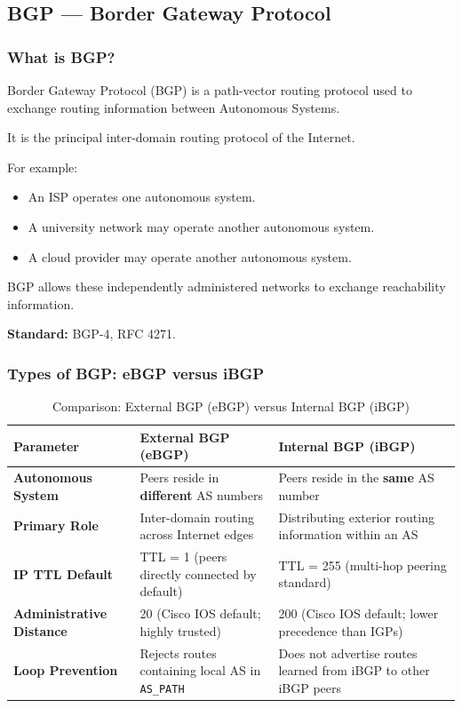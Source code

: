 \subsection{BGP --- Border Gateway Protocol}

\subsubsection{What is BGP?}

Border Gateway Protocol (BGP) is a path-vector routing protocol used to exchange routing information between Autonomous Systems.

It is the principal inter-domain routing protocol of the Internet.

For example:

\begin{itemize}
\item An ISP operates one autonomous system.
\item A university network may operate another autonomous system.
\item A cloud provider may operate another autonomous system.
\end{itemize}

BGP allows these independently administered networks to exchange reachability information.

\textbf{Standard:} BGP-4, RFC 4271.

\subsubsection{Types of BGP: eBGP versus iBGP}
\begin{table}[htbp]
\centering
\caption{Comparison: External BGP (eBGP) versus Internal BGP (iBGP)}
\label{tab:ebgp_vs_ibgp}
\begin{tabularx}{\textwidth}{p{3.8cm} X X}
\toprule
\textbf{Parameter} & \textbf{External BGP (eBGP)} & \textbf{Internal BGP (iBGP)} \\
\midrule
\textbf{Autonomous System} & Peers reside in \textbf{different} AS numbers & Peers reside in the \textbf{same} AS number \\
\textbf{Primary Role} & Inter-domain routing across Internet edges & Distributing exterior routing information within an AS \\
\textbf{IP TTL Default} & TTL = 1 (peers directly connected by default) & TTL = 255 (multi-hop peering standard) \\
\textbf{Administrative Distance} & 20 (Cisco IOS default; highly trusted) & 200 (Cisco IOS default; lower precedence than IGPs) \\
\textbf{Loop Prevention} & Rejects routes containing local AS in \texttt{AS\_PATH} & Does not advertise routes learned from iBGP to other iBGP peers \\
\bottomrule
\end{tabularx}
\end{table}

